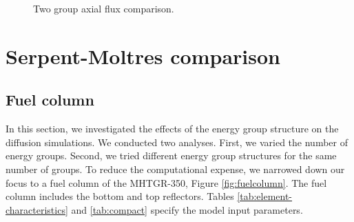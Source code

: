 \documentclass[11pt,letterpaper]{article}
\begin{document}
\begin{figure}[htbp!]
	\centering
	\hfill
  \caption{Two group axial flux comparison.}
	\label{fig:prelim}
\end{figure}

\section{Serpent-Moltres comparison}

\subsection{Fuel column}

In this section, we investigated the effects of the energy group structure on the diffusion simulations.
We conducted two analyses.
First, we varied the number of energy groups.
Second, we tried different energy group structures for the same number of groups.
To reduce the computational expense, we narrowed down our focus to a fuel column of the MHTGR-350, Figure \ref{fig:fuelcolumn}.
The fuel column includes the bottom and top reflectors.
Tables \ref{tab:element-characteristics} and \ref{tab:compact} specify the model input parameters.
\end{document}
